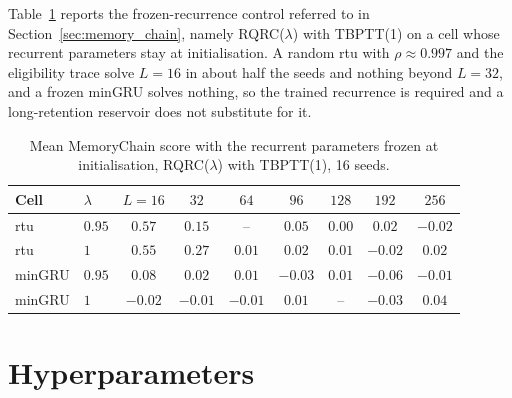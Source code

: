 \documentclass{article}
\begin{document}
Table~\ref{tab:frozen} reports the frozen-recurrence control referred to in
Section~\ref{sec:memory_chain}, namely RQRC($\lambda$) with TBPTT(1) on a cell whose recurrent
parameters stay at initialisation. A random \gls{rtu} with $\rho \approx 0.997$ and the
eligibility trace solve $L{=}16$ in about half the seeds and nothing beyond $L{=}32$, and a
frozen minGRU solves nothing, so the trained recurrence is required and a long-retention
reservoir does not substitute for it.

\begin{table}[htbp]
\centering
\caption{Mean MemoryChain score with the recurrent parameters frozen at initialisation, RQRC($\lambda$) with TBPTT(1), 16 seeds.}
\label{tab:frozen}
\begin{tabular}{llccccccc}
\toprule
Cell & $\lambda$ & $L{=}16$ & $32$ & $64$ & $96$ & $128$ & $192$ & $256$ \\
\midrule
\gls{rtu} & $0.95$ & $0.57$ & $0.15$ & -- & $0.05$ & $0.00$ & $0.02$ & $-0.02$ \\
\gls{rtu} & $1$ & $0.55$ & $0.27$ & $0.01$ & $0.02$ & $0.01$ & $-0.02$ & $0.02$ \\
minGRU & $0.95$ & $0.08$ & $0.02$ & $0.01$ & $-0.03$ & $0.01$ & $-0.06$ & $-0.01$ \\
minGRU & $1$ & $-0.02$ & $-0.01$ & $-0.01$ & $0.01$ & -- & $-0.03$ & $0.04$ \\
\bottomrule
\end{tabular}
\end{table}

\section{Hyperparameters}
  \label{sec:hyperparameters}
\end{document}
